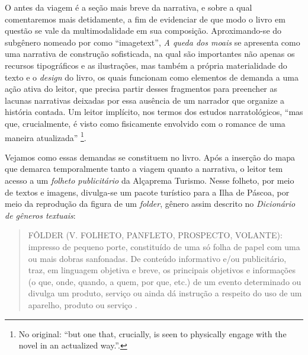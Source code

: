 \documentclass[portuguese]{textolivre}
\begin{document}
O antes da viagem é a seção mais breve da narrativa, e sobre a qual
comentaremos mais detidamente, a fim de evidenciar de que modo o livro em
questão se vale da multimodalidade em sua composição. Aproximando-se do
subgênero nomeado por \textcite[p.~99]{gibbons_i_2010} como “imagetext”,
\textit{A queda dos moais} se apresenta como uma narrativa de construção
sofisticada, na qual são importantes não apenas os recursos tipográficos e as
ilustrações, mas também a própria materialidade do texto e o \textit{design} do
livro, os quais funcionam como elementos de demanda a uma ação ativa do leitor,
que precisa partir desses fragmentos para preencher as lacunas narrativas
deixadas por essa ausência de um narrador que organize a história contada. Um
leitor implícito, nos termos dos estudos narratológicos, “mas que,
crucialmente, é visto como fisicamente envolvido com o romance de uma maneira
atualizada” \cite[p.~100]{gibbons_i_2010}\footnote{No original: “but one that,
crucially, is seen to physically engage with the novel in an actualized
way.”.}.

Vejamos como essas demandas se constituem no livro. Após a inserção do mapa que
demarca temporalmente tanto a viagem quanto a narrativa, o leitor tem acesso a
um \textit{folheto publicitário} da Alçaprema Turismo. Nesse folheto, por meio
de textos e imagens, divulga-se um pacote turístico para a Ilha de Páscoa, por
meio da reprodução da figura de um \textit{folder}, gênero assim descrito no
\textit{Dicionário de gêneros textuais}:

\begin{quote}
    FÔLDER (V. FOLHETO, PANFLETO, PROSPECTO, VOLANTE): impresso de pequeno
    porte, constituído de uma só folha de papel com uma ou mais dobras
    sanfonadas. De conteúdo informativo e/ou publicitário, traz, em linguagem
    objetiva e breve, os principais objetivos e informações (o que, onde,
    quando, a quem, por que, etc.) de um evento determinado ou divulga um
    produto, serviço ou ainda dá instrução a respeito do uso de um aparelho,
    produto ou serviço \cite[p.~127, destaques do original]{costa_dicionario_2012}.
\end{quote}
\end{document}
